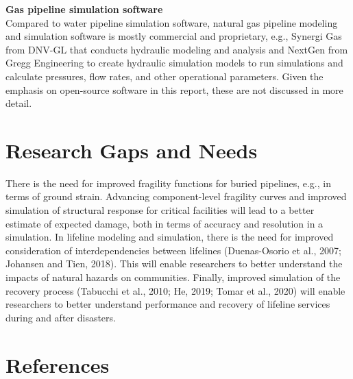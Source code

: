 \noindent\textbf{Gas pipeline simulation software} \\Compared to water pipeline simulation software, natural gas pipeline modeling and simulation software is mostly commercial and proprietary, e.g., Synergi Gas from DNV-GL that conducts hydraulic modeling and analysis and NextGen from Gregg Engineering to create hydraulic simulation models to run simulations and calculate pressures, flow rates, and other operational parameters. Given the emphasis on open-source software in this report, these are not discussed in more detail.

\section{Research Gaps and Needs}
\label{sec:perf_pipeline_gaps}

There is the need for improved fragility functions for buried pipelines, e.g., in terms of ground strain. Advancing component-level fragility curves and improved simulation of structural response for critical facilities will lead to a better estimate of expected damage, both in terms of accuracy and resolution in a simulation. In lifeline modeling and simulation, there is the need for improved consideration of interdependencies between lifelines (Duenas-Osorio et al., 2007; Johansen and Tien, 2018). This will enable researchers to better understand the impacts of natural hazards on communities. Finally, improved simulation of the recovery process (Tabucchi et al., 2010; He, 2019; Tomar et al., 2020) will enable researchers to better understand performance and recovery of lifeline services during and after disasters.

\section{References}





